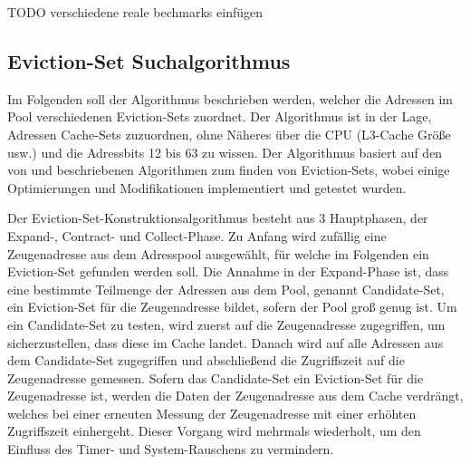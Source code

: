 
%

TODO verschiedene reale bechmarks einfügen 

\subsection{Eviction-Set Suchalgorithmus}

Im Folgenden soll der Algorithmus beschrieben werden, welcher die Adressen im Pool verschiedenen Eviction-Sets zuordnet.
Der Algorithmus ist in der Lage, Adressen Cache-Sets zuzuordnen, ohne Näheres über die CPU (L3-Cache Größe usw.) und die Adressbits 12 bis 63 zu wissen.
Der Algorithmus basiert auf den von \cite{DriveByPaper} und \cite{PrimeAndAbort} beschriebenen Algorithmen zum finden von Eviction-Sets, wobei einige Optimierungen und Modifikationen implementiert und getestet wurden.

Der Eviction-Set-Konstruktionsalgorithmus besteht aus 3 Hauptphasen, der Expand-, Contract- und Collect-Phase. 
Zu Anfang wird zufällig eine Zeugenadresse aus dem Adresspool ausgewählt, für welche im Folgenden ein Eviction-Set gefunden werden soll.
Die Annahme in der Expand-Phase ist, dass eine bestimmte Teilmenge der Adressen aus dem Pool, genannt Candidate-Set, ein Eviction-Set für die Zeugenadresse bildet, sofern der Pool groß genug ist. 
Um ein Candidate-Set zu testen, wird zuerst auf die Zeugenadresse zugegriffen, um sicherzustellen, dass diese im Cache landet.
Danach wird auf alle Adressen aus dem Candidate-Set zugegriffen und abschließend die Zugriffszeit auf die Zeugenadresse gemessen. 
Sofern das Candidate-Set ein Eviction-Set für die Zeugenadresse ist, werden die Daten der Zeugenadresse aus dem Cache verdrängt, welches bei einer erneuten Messung der Zeugenadresse mit einer erhöhten Zugriffszeit einhergeht.
Dieser Vorgang wird mehrmals wiederholt, um den Einfluss des Timer- und System-Rauschens zu vermindern.

